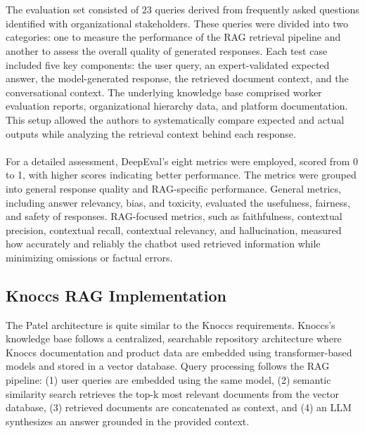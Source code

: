 \\\\
The evaluation set consisted of 23 queries derived from frequently asked questions identified with organizational stakeholders. These queries were divided into two categories: one to measure the performance of the RAG retrieval pipeline and another to assess the overall quality of generated responses. Each test case included five key components: the user query, an expert-validated expected answer, the model-generated response, the retrieved document context, and the conversational context. The underlying knowledge base comprised worker evaluation reports, organizational hierarchy data, and platform documentation. This setup allowed the authors to systematically compare expected and actual outputs while analyzing the retrieval context behind each response.
\\\\
For a detailed assessment, DeepEval's eight metrics were employed, scored from 0 to 1, with higher scores indicating better performance. The metrics were grouped into general response quality and RAG-specific performance. General metrics, including answer relevancy, bias, and toxicity, evaluated the usefulness, fairness, and safety of responses. RAG-focused metrics, such as faithfulness, contextual precision, contextual recall, contextual relevancy, and hallucination, measured how accurately and reliably the chatbot used retrieved information while minimizing omissions or factual errors.

\subsection{Knoccs RAG Implementation}
The Patel architecture is quite similar to the Knoccs requirements. Knoccs's knowledge base follows a centralized, searchable repository architecture where Knoccs documentation and product data are embedded using transformer-based models and stored in a vector database. Query processing follows the RAG pipeline: (1) user queries are embedded using the same model, (2) semantic similarity search retrieves the top-k most relevant documents from the vector database, (3) retrieved documents are concatenated as context, and (4) an LLM synthesizes an answer grounded in the provided context.\\

